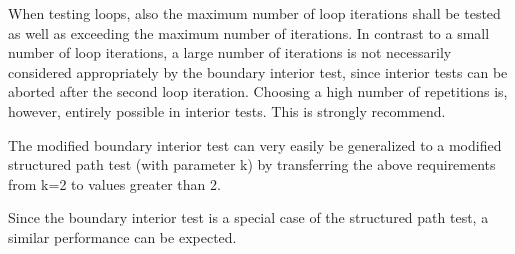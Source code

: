 	When testing loops, also the maximum number of loop iterations shall be tested as well as exceeding the maximum number of iterations. In contrast to a small number of loop iterations, a large number of iterations is not necessarily considered appropriately by the boundary interior test, since interior tests can be aborted after the second loop iteration. Choosing a high number of repetitions is, however, entirely possible in interior tests. This is strongly recommend.

	The modified boundary interior test can very easily be generalized to a modified structured path test (with parameter k) by transferring the above requirements from k=2 to values greater than 2.

	Since the boundary interior test is a special case of the structured path test, a similar performance can be expected.


	
	
